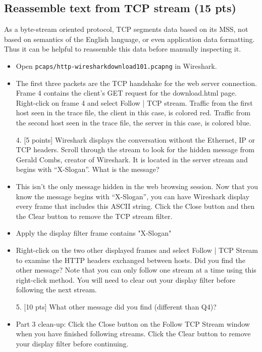 \subsection{Reassemble text from TCP stream (15 pts)}
As a byte-stream oriented protocol, TCP segments data based on its MSS, not based on
semantics of the English language, or even application data formatting. Thus it can be
helpful to reassemble this data before manually inspecting it.
\begin{itemize}
\item Open {\tt pcaps/http-wiresharkdownload101.pcapng} in Wireshark.
\item The first three packets are the TCP handshake for the web server connection. Frame
4 contains the client’s GET request for the download.html page. Right-click on frame
4 and select Follow | TCP stream. Traffic from the first host seen in the trace file,
the client in this case, is colored red. Traffic from the second host seen in the trace
file, the server in this case, is colored blue.
\item[4.] [5 points] Wireshark displays the conversation without the Ethernet, IP or TCP headers.
Scroll through the stream to look for the hidden message from Gerald Combs,
creator of Wireshark. It is located in the server stream and begins with “X-Slogan”.
What is the message?
\item This isn't the only message hidden in the web browsing session. Now that you know
the message begins with “X-Slogan”, you can have Wireshark display every frame that
includes this ASCII string. Click the Close button and then the Clear button to
remove the TCP stream filter.
\item Apply the display filter frame contains "X-Slogan"
\item Right-click on the two other displayed frames and select Follow | TCP Stream to
examine the HTTP headers exchanged between hosts. Did you find the other message?
Note that you can only follow one stream at a time using this right-click method. You
will need to clear out your display filter before following the next stream.
\item[5.] [10 pts] What other message did you find (different than Q4)?
\item Part 3 clean-up: Click the Close button on the Follow TCP Stream window when you
have finished following streams. Click the Clear button to remove your display filter
before continuing.
\end{itemize}
